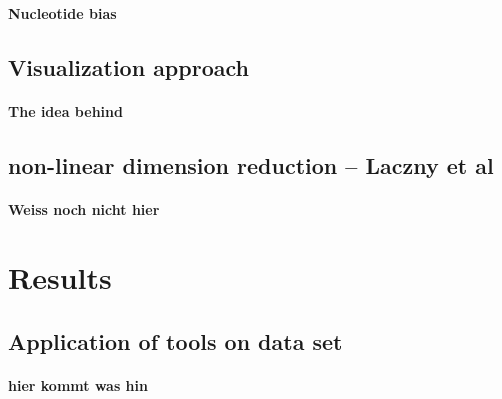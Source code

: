 \documentclass[twocolumn]{bmcart}%
\begin{document}
\paragraph*{Nucleotide bias}
\subsection*{Visualization approach}
\paragraph*{The idea behind}
\subsection*{non-linear dimension reduction -- Laczny et al}
\paragraph*{Weiss noch nicht hier}
\section*{Results}
\subsection*{Application of tools on data set}
\paragraph*{hier kommt was hin}

\end{document}
